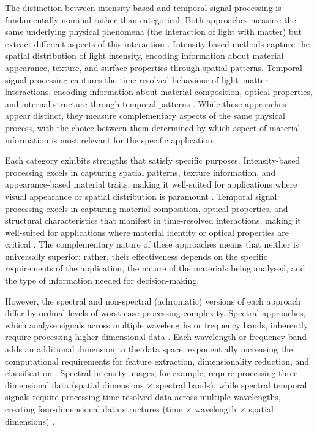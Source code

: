 \documentclass[12pt,a4paper,oneside]{report}
\begin{document}
The distinction between intensity-based and temporal signal processing is fundamentally nominal rather than categorical. Both approaches measure the same underlying physical phenomena (the interaction of light with matter) but extract different aspects of this interaction \cite{su2016,becker2023}. Intensity-based methods capture the spatial distribution of light intensity, encoding information about material appearance, texture, and surface properties through spatial patterns. Temporal signal processing captures the time-resolved behaviour of light--matter interactions, encoding information about material composition, optical properties, and internal structure through temporal patterns \cite{su2016,becker2023}. While these approaches appear distinct, they measure complementary aspects of the same physical process, with the choice between them determined by which aspect of material information is most relevant for the specific application.

Each category exhibits strengths that satisfy specific purposes. Intensity-based processing excels in capturing spatial patterns, texture information, and appearance-based material traits, making it well-suited for applications where visual appearance or spatial distribution is paramount \cite{schwartz2013,sharan2013}. Temporal signal processing excels in capturing material composition, optical properties, and structural characteristics that manifest in time-resolved interactions, making it well-suited for applications where material identity or optical properties are critical \cite{su2016,becker2023,tafone2023}. The complementary nature of these approaches means that neither is universally superior; rather, their effectiveness depends on the specific requirements of the application, the nature of the materials being analysed, and the type of information needed for decision-making.

However, the spectral and non-spectral (achromatic) versions of each approach differ by ordinal levels of worst-case processing complexity. Spectral approaches, which analyse signals across multiple wavelengths or frequency bands, inherently require processing higher-dimensional data \cite{heinz2001,vasile2023}. Each wavelength or frequency band adds an additional dimension to the data space, exponentially increasing the computational requirements for feature extraction, dimensionality reduction, and classification \cite{knuth1976}. Spectral intensity images, for example, require processing three-dimensional data (spatial dimensions $\times$ spectral bands), while spectral temporal signals require processing time-resolved data across multiple wavelengths, creating four-dimensional data structures (time $\times$ wavelength $\times$ spatial dimensions) \cite{tontini2020,koerner2021}.
\end{document}
